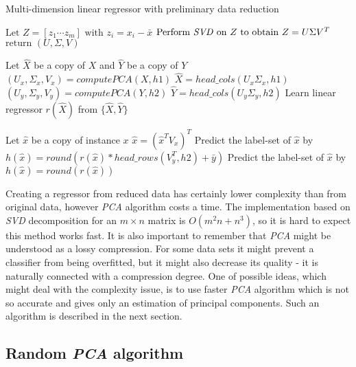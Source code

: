 \begin{algorithm}
    \caption{Multi-dimension linear regressor with preliminary data reduction}\label{alg:pca1}
    \begin{algorithmic}[1]
        \State $\text{Let } Z=[z_1 \cdots z_m] \text{ with } z_i = x_i-\bar{x}$
        \State $\text{Perform \textit{SVD} on } Z \text{ to obtain } Z = U\Sigma{V^T}$
        \State $\text{return } (U,\Sigma,V)$
    \EndFunction
    \item[] 
        \State Let $\hat{X}$ be a copy of $X$ and $\hat{Y}$ be a copy of $Y$
        \State $(U_x, \Sigma_{x}, V_x) = computePCA(X,h1)$
        \State $\hat{X}=head\_cols(U_x\Sigma_{x}, h1)$
    \EndIf
        \State $(U_y, \Sigma_{y}, V_y) = computePCA(Y,h2)$
        \State $\hat{Y}=head\_cols(U_y\Sigma_{y}, h2)$
    \EndIf
    \State Learn linear regressor $r(\hat{X})$ from $\{\hat{X},\hat{Y}\}$
    \item[]
    \State Let $\hat{x}$ be a copy of instance $x$
    \State $\hat{x} = (\hat{x}^TV_x)^T$
    \EndIf
    \State Predict the label-set of $\hat{x}$ by $h(\hat{x})=round( r(\hat{x}) * head\_rows(V_y^T, h2) + \bar{y})$ 
    \Else
    \State Predict the label-set of $\hat{x}$ by $h(\hat{x})=round( r(\hat{x}) )$ 
    \EndIf

    \end{algorithmic}
\end{algorithm}

Creating a regressor from reduced data has certainly lower complexity than from original data, however \textit{PCA} algorithm costs a time. The implementation based on \textit{SVD} decomposition for an $m\times{n}$ matrix is $O(m^2n + n^3)$, so it is hard to expect this method works fast. It is also important to remember that \textit{PCA} might be understood as a lossy compression. For some data sets it might prevent a classifier from being overfitted, but it might also decrease its quality - it is naturally connected with a compression degree. 
One of possible ideas, which might deal with the complexity issue, is to use faster \textit{PCA} algorithm which is not so accurate and gives only an estimation of principal components. Such an algorithm is described in the next section.

\subsection{Random \textit{PCA} algorithm}

